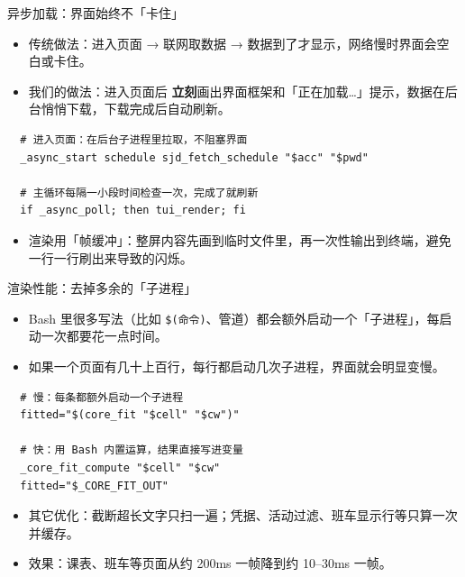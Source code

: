 \documentclass[aspectratio=169]{beamer}
\begin{document}
\begin{frame}[fragile]{异步加载：界面始终不「卡住」}
  \begin{itemize}
    \setlength\itemsep{0.5em}
    \item 传统做法：进入页面 → 联网取数据 → 数据到了才显示，网络慢时界面会空白或卡住。
    \item 我们的做法：进入页面后 \textbf{立刻}画出界面框架和「正在加载…」提示，数据在后台悄悄下载，下载完成后自动刷新。
  \end{itemize}
  {\footnotesize
  \begin{verbatim}
  # 进入页面：在后台子进程里拉取，不阻塞界面
  _async_start schedule sjd_fetch_schedule "$acc" "$pwd"

  # 主循环每隔一小段时间检查一次，完成了就刷新
  if _async_poll; then tui_render; fi
  \end{verbatim}
  }
  \begin{itemize}
    \item 渲染用「帧缓冲」：整屏内容先画到临时文件里，再一次性输出到终端，避免一行一行刷出来导致的闪烁。
  \end{itemize}
\end{frame}

\begin{frame}[fragile]{渲染性能：去掉多余的「子进程」}
  \begin{itemize}
    \setlength\itemsep{0.5em}
    \item Bash 里很多写法（比如 \texttt{\$(命令)}、管道）都会额外启动一个「子进程」，每启动一次都要花一点时间。
    \item 如果一个页面有几十上百行，每行都启动几次子进程，界面就会明显变慢。
  \end{itemize}
  {\footnotesize
  \begin{verbatim}
  # 慢：每条都额外启动一个子进程
  fitted="$(core_fit "$cell" "$cw")"

  # 快：用 Bash 内置运算，结果直接写进变量
  _core_fit_compute "$cell" "$cw"
  fitted="$_CORE_FIT_OUT"
  \end{verbatim}
  }
  \begin{itemize}
    \setlength\itemsep{0.5em}
    \item 其它优化：截断超长文字只扫一遍；凭据、活动过滤、班车显示行等只算一次并缓存。
    \item 效果：课表、班车等页面从约 200ms 一帧降到约 10--30ms 一帧。
  \end{itemize}
\end{frame}

\end{document}
